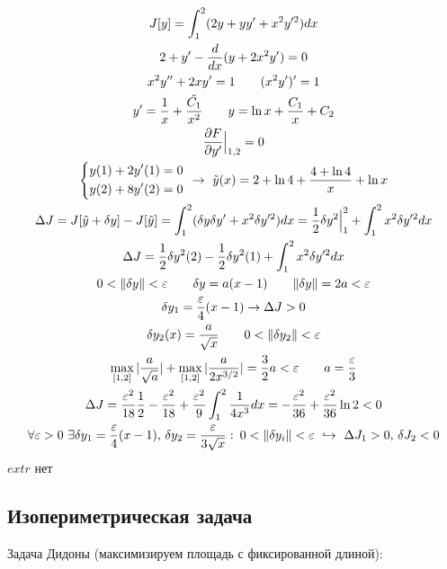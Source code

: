 \documentclass{article}
\begin{document}
\begin{eg}
  \begin{gather*}
    J[y]=\int_{1}^{2}(2y+yy'+x^{2}y'^{2})dx \\ 
    2+y'-\frac{d}{dx}(y+2x^{2}y')=0 \\ 
    x^{2}y'' + 2xy' =1 \qquad (x^{2}y')'=1 \\ 
    y'=\frac{1}{x}+\frac{\tilde{C_1}}{x^{2}} \qquad y =\ln x + \frac{C_1}{x} + C_2 \\ 
    \frac{\partial{F}}{\partial{y'}}\Big|_{1,2}=0 \\ 
    \left\{\begin{aligned}
      & y(1) + 2y'(1) = 0 \\ 
      & y(2) + 8 y'(2) =0 
    \end{aligned}\right. \ \rightarrow \ \tilde{y}(x)=2+\ln 4 + \frac{4+ \ln 4}{x} + \ln x \\ 
    \Delta J = J[\tilde{y}+\delta y] - J[\tilde{y}]=\int_{1}^{2}(\delta y \delta y' + x^{2} \delta y'^{2})dx
    = \frac{1}{2}\delta y^{2} \Big|_{1}^{2} + \int_{1}^{2}x^{2}\delta y'^{2}dx \\ 
    \Delta J = \frac{1}{2}\delta y^{2}(2) - \frac{1}{2}\delta y^{2}(1) + \int_{1}^{2}x^{2}\delta y'^{2}dx \\ 
    0<\Vert \delta y \Vert < \varepsilon \qquad \delta y = a(x-1) \qquad \Vert \delta y \Vert=2a < \varepsilon \\ 
    \delta y_1 = \frac{\varepsilon}{4}(x-1) \rightarrow \Delta J > 0 \\ 
    \delta y_2(x)=\frac{a}{\sqrt{x}} \qquad 0 < \Vert \delta y_2 \Vert < \varepsilon \\ 
    \max_{[1,2]}|\frac{a}{\sqrt{a}}|+\max_{[1,2]}|\frac{a}{2x^{3/2}}|=\frac{3}{2}a < \varepsilon \qquad a = \frac{\varepsilon}{3} \\ 
    \Delta J = \frac{\varepsilon^{2}}{18}\frac{1}{2} - \frac{\varepsilon^{2}}{18} + \frac{\varepsilon^{2}}{9}\int_{1}^{2}\frac{1}{4x^{3}}dx 
    = -\frac{\varepsilon^{2}}{36} + \frac{\varepsilon^{2}}{36} \ln 2 < 0  \\ 
    \forall \varepsilon > 0 \ \exists \delta y_1=\frac{\varepsilon}{4}(x-1), \, \delta y_2=\frac{\varepsilon}{3\sqrt{x}}: \:
    0 < \Vert \delta y_i \Vert < \varepsilon \ \hookrightarrow \ \Delta J_1 >0, \, \delta J_2 < 0
  \end{gather*}
  $extr$ нет
\end{eg}


\subsection{Изопериметрическая задача}
Задача Дидоны (максимизируем площадь с фиксированной длиной):
\end{document}
